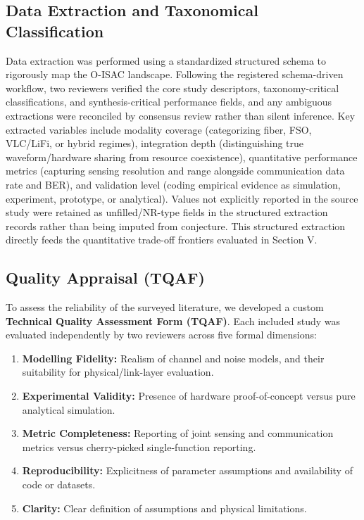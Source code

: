 \documentclass[letterpaper,journal]{IEEEtran}
\begin{document}
\subsection{Data Extraction and Taxonomical Classification}
Data extraction was performed using a standardized structured schema to rigorously map the O-ISAC landscape. Following the registered schema-driven workflow, two reviewers verified the core study descriptors, taxonomy-critical classifications, and synthesis-critical performance fields, and any ambiguous extractions were reconciled by consensus review rather than silent inference. Key extracted variables include modality coverage (categorizing fiber, FSO, VLC/LiFi, or hybrid regimes), integration depth (distinguishing true waveform/hardware sharing from resource coexistence), quantitative performance metrics (capturing sensing resolution and range alongside communication data rate and BER), and validation level (coding empirical evidence as simulation, experiment, prototype, or analytical). Values not explicitly reported in the source study were retained as unfilled/NR-type fields in the structured extraction records rather than being imputed from conjecture. This structured extraction directly feeds the quantitative trade-off frontiers evaluated in Section V.

\subsection{Quality Appraisal (TQAF)}
To assess the reliability of the surveyed literature, we developed a custom \textbf{Technical Quality Assessment Form (TQAF)}. Each included study was evaluated independently by two reviewers across five formal dimensions:
\begin{enumerate}
    \item \textbf{Modelling Fidelity:} Realism of channel and noise models, and their suitability for physical/link-layer evaluation.
    \item \textbf{Experimental Validity:} Presence of hardware proof-of-concept versus pure analytical simulation.
    \item \textbf{Metric Completeness:} Reporting of joint sensing and communication metrics versus cherry-picked single-function reporting.
    \item \textbf{Reproducibility:} Explicitness of parameter assumptions and availability of code or datasets.
    \item \textbf{Clarity:} Clear definition of assumptions and physical limitations.
\end{enumerate}
\end{document}
